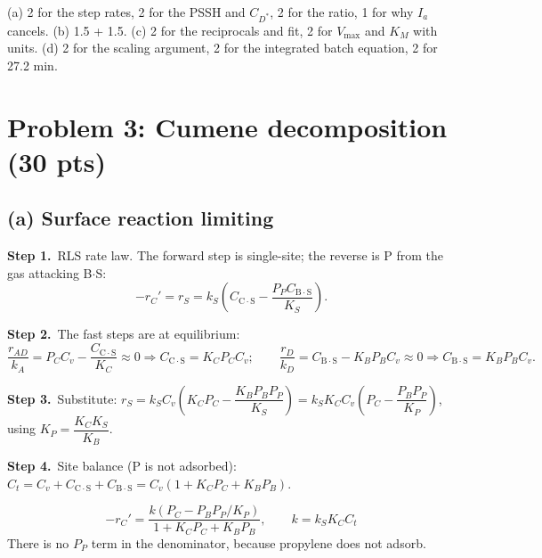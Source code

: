 \documentclass[11pt]{article}
\newcommand{\AS}[1]{\mathrm{#1\!\cdot\!S}}
\newcommand{\step}[1]{\par\smallskip\textbf{Step #1.}\ }
\begin{document}
\begin{grading}
(a) 2 for the step rates, 2 for the PSSH and $C_{D^*}$, 2 for the ratio, 1 for why $I_a$ cancels.
(b) 1.5 + 1.5. (c) 2 for the reciprocals and fit, 2 for $V_{\max}$ and $K_M$ with units.
(d) 2 for the scaling argument, 2 for the integrated batch equation, 2 for 27.2 min.
\end{grading}

\section*{Problem 3: Cumene decomposition (30 pts)}

\subsection*{(a) Surface reaction limiting}
\step{1}RLS rate law. The forward step is single-site; the reverse is P from the gas attacking B$\cdot$S:
\[
-r_C'=r_S=k_S\left(C_{\AS{C}}-\frac{P_PC_{\AS{B}}}{K_S}\right).
\]
\step{2}The fast steps are at equilibrium:
\[
\frac{r_{AD}}{k_A}=P_CC_v-\frac{C_{\AS{C}}}{K_C}\approx0\Rightarrow C_{\AS{C}}=K_CP_CC_v;\qquad
\frac{r_D}{k_D}=C_{\AS{B}}-K_BP_BC_v\approx0\Rightarrow C_{\AS{B}}=K_BP_BC_v .
\]
\step{3}Substitute:
$r_S=k_SC_v\left(K_CP_C-\dfrac{K_BP_BP_P}{K_S}\right)=k_SK_CC_v\left(P_C-\dfrac{P_BP_P}{K_P}\right)$, using $K_P=\dfrac{K_CK_S}{K_B}$.

\step{4}Site balance (P is not adsorbed): $C_t=C_v+C_{\AS{C}}+C_{\AS{B}}=C_v(1+K_CP_C+K_BP_B)$.
\begin{answer}
\[
-r_C'=\frac{k\left(P_C-P_BP_P/K_P\right)}{1+K_CP_C+K_BP_B},\qquad k=k_SK_CC_t
\]
There is no $P_P$ term in the denominator, because propylene does not adsorb.
\end{answer}
\end{document}

